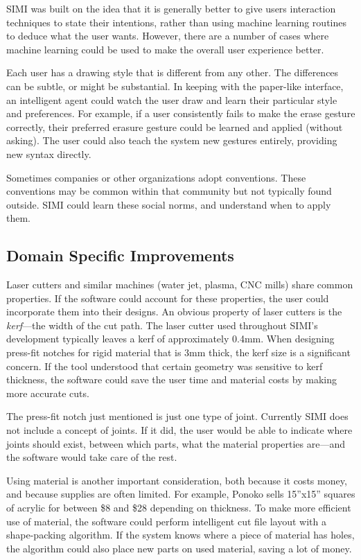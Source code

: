 SIMI was built on the idea that it is generally better to give users
interaction techniques to state their intentions, rather than using
machine learning routines to deduce what the user wants. However,
there are a number of cases where machine learning could be used to
make the overall user experience better.

Each user has a drawing style that is different from any other. The
differences can be subtle, or might be substantial. In keeping with
the paper-like interface, an intelligent agent could watch the user
draw and learn their particular style and preferences. For example, if
a user consistently fails to make the erase gesture correctly, their
preferred erasure gesture could be learned and applied (without
asking). The user could also teach the system new gestures entirely,
providing new syntax directly.

Sometimes companies or other organizations adopt conventions. These
conventions may be common within that community but not typically
found outside. SIMI could learn these social norms, and understand
when to apply them.

\subsection{Domain Specific Improvements}

Laser cutters and similar machines (water jet, plasma, CNC mills)
share common properties. If the software could account for these
properties, the user could incorporate them into their designs. An
obvious property of laser cutters is the \textit{kerf}---the width of
the cut path. The laser cutter used throughout SIMI's development
typically leaves a kerf of approximately 0.4mm. When designing
press-fit notches for rigid material that is 3mm thick, the kerf size
is a significant concern. If the tool understood that certain geometry
was sensitive to kerf thickness, the software could save the user time
and material costs by making more accurate cuts.

The press-fit notch just mentioned is just one type of
joint. Currently SIMI does not include a concept of joints. If it did,
the user would be able to indicate where joints should exist, between
which parts, what the material properties are---and the software would
take care of the rest.

Using material is another important consideration, both because it
costs money, and because supplies are often limited. For example,
Ponoko sells 15''x15'' squares of acrylic for between \$8 and \$28
depending on thickness. To make more efficient use of material, the
software could perform intelligent cut file layout with a
shape-packing algorithm. If the system knows where a piece of material
has holes, the algorithm could also place new parts on used material,
saving a lot of money.


